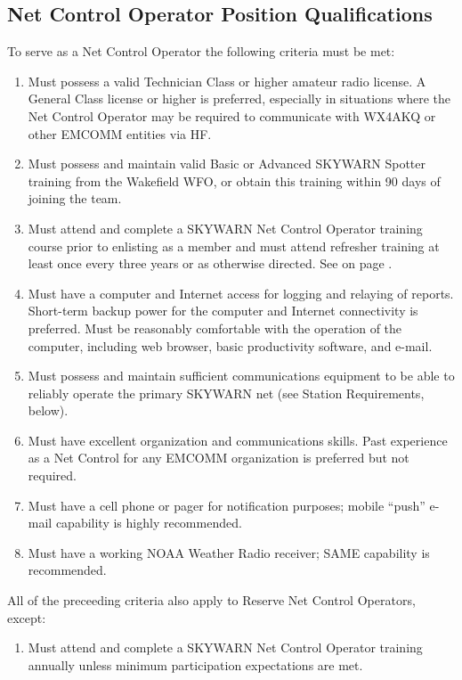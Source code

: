 \documentclass[pdflatex,letterpaper,twoside,12pt]{book}
\begin{document}
\subsection{Net Control Operator Position Qualifications}\label{nco-criteria}

To serve as a Net Control Operator the following criteria must be met:

\begin{enumerate}
\item Must possess a valid Technician Class or higher amateur radio license.  A General Class license or higher is preferred, especially in situations where the Net Control Operator may be required to communicate with WX4AKQ or other EMCOMM entities via HF.
\item Must possess and maintain valid Basic or Advanced SKYWARN Spotter training from the Wakefield WFO, or obtain this training within 90 days of joining the team.
\item Must attend and complete a SKYWARN Net Control Operator training course prior to enlisting as a member and must attend refresher training at least once every three years or as otherwise directed.  See  on page \pageref{nco-training}.
\item Must have a computer and Internet access for logging and relaying of reports.  Short-term backup power for the computer and Internet connectivity is preferred.  Must be reasonably comfortable with the operation of the computer, including web browser, basic productivity software, and e-mail.
\item Must possess and maintain sufficient communications equipment to be able to reliably operate the primary SKYWARN net (see Station Requirements, below).
\item Must have excellent organization and communications skills.  Past experience as a Net Control for any EMCOMM organization is preferred but not required.
\item Must have a cell phone or pager for notification purposes;  mobile ``push'' e-mail capability is highly recommended.
\item Must have a working NOAA Weather Radio receiver;  SAME capability is recommended.
\end{enumerate}

All of the preceeding criteria also apply to Reserve Net Control Operators, except:

\begin{enumerate}
\item Must attend and complete a SKYWARN Net Control Operator training annually unless minimum participation expectations are met.
\end{enumerate}
\end{document}
